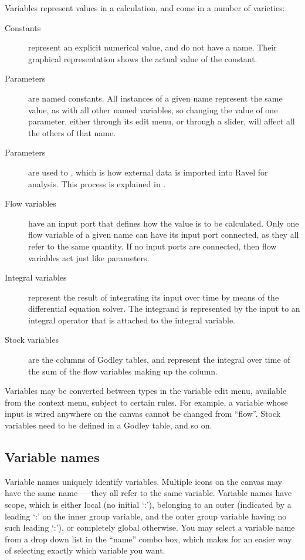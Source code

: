 Variables represent values in a calculation, and come in a number
of varieties: 
\begin{description}
\item [{Constants}] represent an explicit numerical value, and do not have
a name. Their graphical representation shows the actual value of the
constant. 
\item [{Parameters}] are named constants. All instances of a given name
represent the same value, as with all other named variables, so changing
the value of one parameter, either through its edit menu, or through
a slider, will affect all the others of that name.
\item [{Parameters}] are used to , which is how external data is imported into Ravel for analysis.
This process is explained in .
\item [{Flow variables}] have an input port that defines how the value
is to be calculated. Only one flow variable of a given name can have
its input port connected, as they all refer to the same quantity.
If no input ports are connected, then flow variables act just like
parameters. 
\item [{Integral variables}] represent the result of integrating its input
over time by means of the differential equation solver. The integrand
is represented by the input to an integral operator that is attached
to the integral variable. 
\item [{Stock variables}] are the columns of Godley tables, and represent
the integral over time of the sum of the flow variables making up
the column. 
\end{description}
Variables may be converted between types in the variable edit menu,
available from the context menu, subject to certain rules. For example,
a variable whose input is wired anywhere on the canvas cannot be changed
from ``flow''. Stock variables need to be defined in a Godley table,
and so on.

\subsection{Variable names}

Variable names uniquely identify variables. Multiple icons on the
canvas may have the same name --- they all refer to the same variable.
Variable names have scope, which is either local (no initial `:'),
belonging to an outer  (indicated by a
leading `:' on the inner group variable, and the outer group variable
having no such leading `:'), or completely global otherwise. You may
select a variable name from a drop down list in the ``name'' combo
box, which makes for an easier way of selecting exactly which variable
you want.


